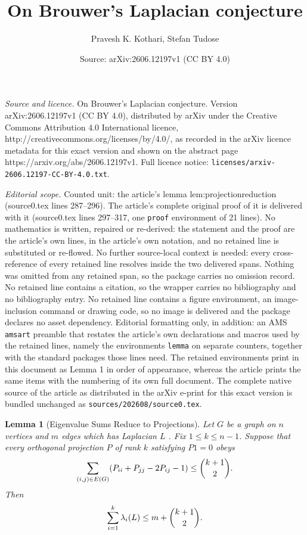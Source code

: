 \documentclass[10pt,a4paper]{amsart}
\title{On Brouwer's Laplacian conjecture}
\author{Pravesh K. Kothari, Stefan Tudose}
\date{Source: arXiv:2606.12197v1 (CC BY 4.0)}
\newtheorem{lemma}{Lemma}
\begin{document}
\maketitle

\noindent\emph{Source and licence.} On Brouwer's Laplacian conjecture. Version arXiv:2606.12197v1 (CC BY 4.0), distributed by arXiv under the Creative Commons Attribution 4.0 International licence, http://creativecommons.org/licenses/by/4.0/, as recorded in the arXiv licence metadata for this exact version and shown on the abstract page https://arxiv.org/abs/2606.12197v1. Full licence notice: \texttt{licenses/arxiv-2606.12197-CC-BY-4.0.txt}.\par\smallskip

\noindent\textit{Editorial scope.} Counted unit: the article's lemma lem:projectionreduction (source0.tex lines 287--296). The article's complete original proof of it is delivered with it (source0.tex lines 297--317, one \texttt{proof} environment of 21 lines). No mathematics is written, repaired or re-derived: the statement and the proof are the article's own lines, in the article's own notation, and no retained line is substituted or re-flowed.  No further source-local context is needed: every cross-reference of every retained line resolves inside the two delivered spans.  Nothing was omitted from any retained span, so the package carries no omission record.  No retained line contains a citation, so the wrapper carries no bibliography and no bibliography entry.  No retained line contains a figure environment, an image-inclusion command or drawing code, so no image is delivered and the package declares no asset dependency.  Editorial formatting only, in addition: an AMS \texttt{amsart} preamble that restates the article's own declarations and macros used by the retained lines, namely the environments \texttt{lemma} on separate counters, together with the standard packages those lines need.  The retained environments print in this document as Lemma 1 in order of appearance, whereas the article prints the same items with the numbering of its own full document.  The complete native source of the article as distributed in the arXiv e-print for this exact version is bundled unchanged as \texttt{sources/202608/source0.tex}.
\begin{lemma}[Eigenvalue Sums Reduce to Projections]\label{lem:projectionreduction}
Let $G$ be a graph on $n$ vertices and $m$ edges which has Laplacian $L$ . Fix $1\le k\le n-1$. Suppose that every orthogonal projection $P$ of rank $k$ satisfying $P1=0$ obeys
\[
    \sum\limits_{(i,j)\in E(G)}(P_{ii}+P_{jj}-2P_{ij}-1)\le \dbinom{k+1}{2}.
\]
Then
\[
    \sum\limits_{i=1}^{k}\lambda_i(L)\le m+\dbinom{k+1}{2}.
\]
\end{lemma}
\end{document}

